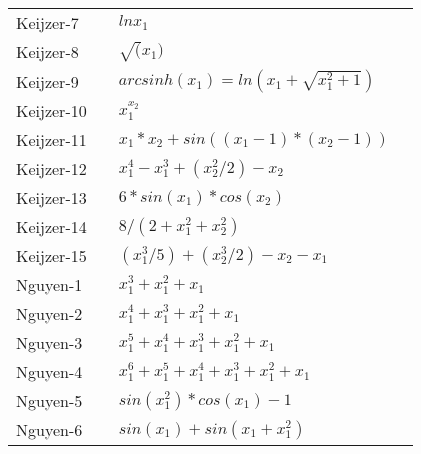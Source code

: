 \begin{table*}[htbp]
\begin{center}
\begin{tabular}{llll}
Keijzer-7 & \cite{demelo2014kaizen,oliveira2016dispersion,miranda2017how} & $ln x_1$ &  \\ 
Keijzer-8 & \cite{demelo2014kaizen,miranda2017how,liskowski2017discovery} & $\sqrt(x_1)$ &  \\ 
Keijzer-9 & \cite{demelo2014kaizen,miranda2017how} & $arcsinh(x_1) = ln(x_1+\sqrt{x_1^2+1})$ &  \\ 
Keijzer-10 & \cite{wieloch2013running,demelo2014kaizen,thuong2017combining} & $x_1^{x_2}$ &  \\ 
Keijzer-11 & \cite{krawiec2014behavioral,demelo2014kaizen,chen2016improving,thuong2017combining} & $x_1*x_2+sin((x_1-1)*(x_2-1))$ &  \\ 
Keijzer-12 & \cite{wieloch2013running,krawiec2014behavioral,demelo2014kaizen,chen2016improving,thuong2017combining} & $x_1^4-x_1^3+(x_2^2/2)-x_2$ &  \\ 
Keijzer-13 & \cite{krawiec2014behavioral,demelo2014kaizen,thuong2017combining} & $6*sin(x_1)*cos(x_2)$ &  \\ 
Keijzer-14 & \cite{krawiec2014behavioral,demelo2014kaizen,chen2016improving,liskowski2017discovery,thuong2017combining} & $8/(2+x_1^2+x_2^2)$ &  \\ 
Keijzer-15 & \cite{krawiec2014behavioral,demelo2014kaizen,chen2016improving,liskowski2017discovery,thuong2017combining} & $(x_1^3/5)+(x_2^3/2)-x_2-x_1$ &  \\ 
Nguyen-1 & \cite{worm2013prioritized,demelo2014kaizen,sotto2017probabilistic} & $x_1^3+x_1^2+x_1$ &  \\ 
Nguyen-2 & \cite{worm2013prioritized,lopes2013gearnet,harada2014asynchronously,demelo2014kaizen,whigham2015examining,sotto2017probabilistic,medvet2017evolvability} & $x_1^4+x_1^3+x_1^2+x_1$ &  \\ 
Nguyen-3 & \cite{worm2013prioritized,wieloch2013running,krawiec2014behavioral,demelo2014kaizen,sotto2017probabilistic,liskowski2017discovery} & $x_1^5+x_1^4+x_1^3+x_1^2+x_1$ &  \\ 
Nguyen-4 & \cite{worm2013prioritized,wieloch2013running,krawiec2014behavioral,demelo2014kaizen,sotto2017probabilistic,liskowski2017discovery} & $x_1^6+x_1^5+x_1^4+x_1^3+x_1^2+x_1$ &  \\ 
Nguyen-5 & \cite{worm2013prioritized,wieloch2013running,harada2014asynchronously,krawiec2014behavioral,demelo2014kaizen,liskowski2017discovery} & $sin(x_1^2)*cos(x_1)-1$ &  \\ 
Nguyen-6 & \cite{worm2013prioritized,wieloch2013running,krawiec2014behavioral,demelo2014kaizen,sotto2017probabilistic,liskowski2017discovery} & $sin(x_1)+sin(x_1+x_1^2)$ &  \\ 

\end{tabular}
\end{center}
\end{table*}
